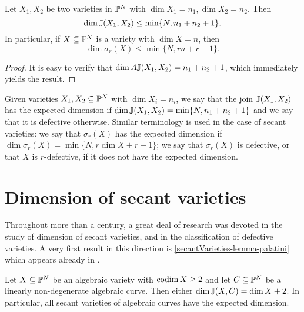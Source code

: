 \begin{lemma}
\label{secantVarieties-lemma-expecteddimension}
Let $X_1,X_2$ be two varieties in $\mathbb{P}^N$ with $\dim X_1 = n_1, \dim X_2 = n_2$. Then 
\[
\dim \mathbb{J}(X_1,X_2) \leq \min\{ N, n_1 + n_2 + 1\}.
\]
In particular, if $X \subseteq \mathbb{P}^N$ is a variety with $\dim X = n$, then 
\[
\dim \sigma_r(X) \leq \min\{ N , rn + r-1\}.
\]
\end{lemma}
\begin{proof}
It is easy to verify that $\dim A \mathbb{J}(X_1,X_2) =  n_1 + n_2 + 1$, which immediately yields the result.
\end{proof}
Given varieties $X_1,X_2 \subseteq \mathbb{P}^N$ with $\dim X_i = n_i$, we say that the join $\mathbb{J}(X_1,X_2)$ has the expected dimension if $\dim \mathbb{J}(X_1,X_2) =  \min\{ N, n_1 + n_2 + 1\}$ and we say that it is defective otherwise. Similar terminology is used in the case of secant varieties: we say that $\sigma_r(X)$ has the expected dimension if $\dim \sigma_r(X) = \min\{ N , r \dim X + r-1\}$; we say that $\sigma_r(X)$ is defective, or that $X$ is $r$-defective, if it does not have the expected dimension. 

\section{Dimension of secant varieties}
\label{secantVarieties-section-dimension}

Throughout more than a century, a great deal of research was devoted in the study of dimension of secant varieties, and in the classification of defective varieties. A very first result in this direction is \ref{secantVarieties-lemma-palatini} which appears already in \cite{Pal09}. 

\begin{lemma}
\label{secantVarieties-lemma-palatini}
Let $X \subseteq \mathbb{P}^N$ be an algebraic variety with $\operatorname{codim} X \geq 2$ and let $C \subseteq \mathbb{P}^N$ be a linearly non-degenerate algebraic curve. Then either $\dim \mathbb{J}(X,C) = \dim X + 2$. In particular, all secant varieties of algebraic curves have the expected dimension.
\end{lemma}


